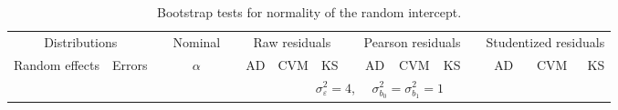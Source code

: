 \begin{table}[ht]
\begin{scriptsize}
\begin{center}
\begin{tabular}{ll p{.1cm} c p{.1cm} rrr p{.1cm} rrr p{.1cm} rrr}
   \hline
\end{tabular}
\end{center}
\end{scriptsize}
\end{table}



\begin{table}[ht]
\caption{\label{tab:bootb0}Bootstrap tests for normality of the random intercept.}
\begin{scriptsize}
\begin{center}
\begin{tabular}{ll p{.1cm} c p{.1cm} rrr p{.1cm} rrr p{.1cm} rrr}
  \hline
  \multicolumn{2}{c}{Distributions}& & Nominal & &  \multicolumn{3}{c}{Raw residuals} & & \multicolumn{3}{c}{Pearson residuals} & & \multicolumn{3}{c}{Studentized residuals}\\ \cline{1-2} \cline{6-8} \cline{10-12} \cline{14-16}
  Random effects & Errors & & $\alpha$ & & AD & CVM & KS & & AD & CVM & KS & & AD & CVM & KS \\ 
   \hline
& && && \multicolumn{9}{c}{$\sigma_{\varepsilon}^2 = 4$, \ \ $\sigma_{b_0}^2 = \sigma_{b_1}^2 = 1$} \\ \cline{6-16}


\end{tabular}
\end{center}
\end{scriptsize}
\end{table}
